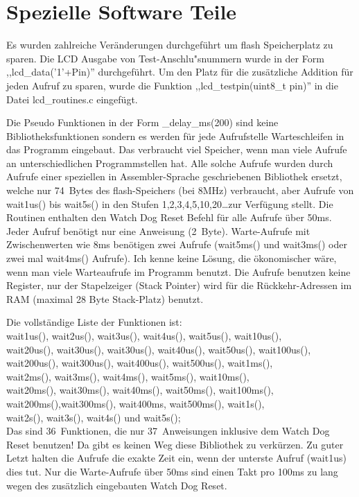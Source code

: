 
\chapter{Spezielle Software Teile}

Es wurden zahlreiche Ver\"anderungen durchgef\"uhrt um flash Speicherplatz zu sparen.
Die LCD Ausgabe von Test-Anschlu"snummern wurde in der Form ,,lcd\_data('1'+Pin)'' durchgef\"uhrt.
Um den Platz f\"ur die zus\"atzliche Addition f\"ur jeden Aufruf zu sparen, wurde die
Funktion ,,lcd\_testpin(uint8\_t pin)'' in die Datei lcd\_routines.c eingef\"ugt.


Die Pseudo Funktionen in der Form \_delay\_ms(200) sind keine Bibliotheksfunktionen
sondern es werden f\"ur jede Aufrufstelle Warteschleifen in das Programm eingebaut.
Das verbraucht viel Speicher, wenn man viele Aufrufe an unterschiedlichen Programmstellen hat.
Alle solche Aufrufe wurden durch Aufrufe einer speziellen in Assembler-Sprache geschriebenen
Bibliothek ersetzt, welche nur 74~Bytes des flash-Speichers (bei 8MHz) verbraucht, aber
Aufrufe von wait1us() bis wait5s() in den Stufen 1,2,3,4,5,10,20\dots zur Verf\"ugung stellt.
Die Routinen enthalten den Watch Dog Reset Befehl f\"ur alle Aufrufe \"uber 50ms.
Jeder Aufruf ben\"otigt nur eine Anweisung (2~Byte). Warte-Aufrufe mit Zwischenwerten
wie 8ms ben\"otigen zwei Aufrufe (wait5ms() und wait3ms() oder zwei mal wait4ms() Aufrufe).
Ich kenne keine L\"osung, die \"okonomischer w\"are, wenn man viele Warteaufrufe im Programm benutzt.
Die Aufrufe benutzen keine Register, nur der Stapelzeiger (Stack Pointer) wird f\"ur die R\"uckkehr-Adressen
im RAM (maximal 28 Byte Stack-Platz) benutzt.

Die vollst\"andige Liste der Funktionen ist:\\
wait1us(), wait2us(), wait3us(), wait4us(), wait5us(), wait10us(), \\
wait20us(), wait30us(), wait30us(), wait40us(), wait50us(), wait100us(), \\
wait200us(), wait300us(), wait400us(), wait500us(), wait1ms(),\\
wait2ms(), wait3ms(), wait4ms(), wait5ms(), wait10ms(),\\
wait20ms(), wait30ms(), wait40ms(), wait50ms(), wait100ms(),\\
wait200ms(),wait300ms(), wait400ms, wait500ms(), wait1s(),\\
wait2s(), wait3s(), wait4s() und wait5s();\\
Das sind 36~Funktionen, die nur 37~Anweisungen inklusive dem Watch Dog Reset benutzen!
Da gibt es keinen Weg diese Bibliothek zu verk\"urzen.
Zu guter Letzt halten die Aufrufe die exakte Zeit ein, wenn der unterste Aufruf (wait1us) dies tut.
Nur die Warte-Aufrufe \"uber 50ms sind einen Takt pro 100ms zu lang wegen des zus\"atzlich eingebauten
Watch Dog Reset.


